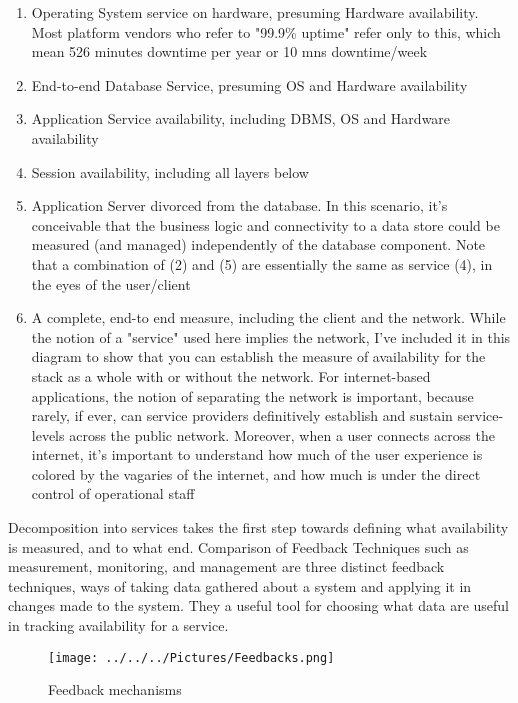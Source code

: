 \documentclass[english]{tktltiki2}
\theoremstyle{definition}
\theoremstyle{remark}
\begin{document}
\pagebreak
\begin{enumerate}
\item Operating System service on hardware, presuming Hardware availability. Most platform vendors who refer to "99.9\% uptime" refer only to this,
which mean 526 minutes downtime per year or  10 mns downtime/week
\item End-to-end Database Service, presuming OS and Hardware availability
\item Application Service availability, including
DBMS, OS and Hardware availability
\item Session availability, including all layers below
\item Application Server divorced from the database. In this scenario, it's conceivable that the business logic and connectivity to a data store could be measured (and managed) independently of the database component. Note that a combination of (2) and (5) are essentially the same as service (4), in the eyes of the user/client
\item A complete, end-to end measure, including the client and the network.
While the notion of a "service" used here
implies the network, I've included it in this diagram to show that you can establish the measure of availability for the stack as a
whole with or without the network. For internet-based applications, the notion of separating the network is important, because rarely, if ever, can service providers definitively establish and sustain service-levels across the public network. Moreover, when a user connects across
the internet, it's important to understand how much of the user experience is colored by the vagaries of the internet, and how much is under the direct control of operational staff
\end{enumerate}
Decomposition into services takes the first step towards defining what availability is measured, and to what end.  Comparison of Feedback Techniques such as measurement, monitoring, and management are three distinct feedback techniques, ways of taking data gathered about a system and applying it in changes made to the system. They  a useful tool for choosing what data are useful in tracking availability for a service.

\pagebreak

\begin{figure}[h!]
\texttt{[image: ../../../Pictures/Feedbacks.png]} 
\caption{Feedback mechanisms \cite{AAMES}}
\label{fig:FB} 
\end{figure}
\end{document}
